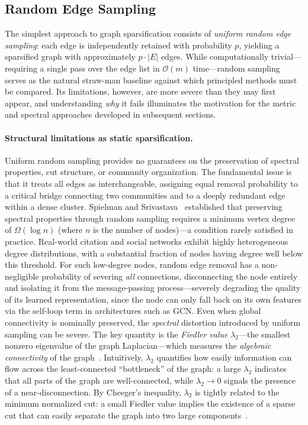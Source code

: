 \documentclass[conference]{IEEEtran}
\begin{document}
\subsection{Random Edge Sampling}

The simplest approach to graph sparsification consists of \emph{uniform random edge sampling}: each edge is independently retained with probability $p$, yielding a sparsified graph with approximately $p \cdot |E|$ edges. While computationally trivial---requiring a single pass over the edge list in $\mathcal{O}(m)$ time---random sampling serves as the natural straw-man baseline against which principled methods must be compared. Its limitations, however, are more severe than they may first appear, and understanding \emph{why} it fails illuminates the motivation for the metric and spectral approaches developed in subsequent sections.

\paragraph{Structural limitations as static sparsification.} Uniform random sampling provides no guarantees on the preservation of spectral properties, cut structure, or community organization. The fundamental issue is that it treats all edges as interchangeable, assigning equal removal probability to a critical bridge connecting two communities and to a deeply redundant edge within a dense cluster. Spielman and Srivastava~\cite{spielman2008} established that preserving spectral properties through random sampling requires a minimum vertex degree of $\Omega(\log n)$ (where $n$ is the number of nodes)---a condition rarely satisfied in practice. Real-world citation and social networks exhibit highly heterogeneous degree distributions, with a substantial fraction of nodes having degree well below this threshold. For such low-degree nodes, random edge removal has a non-negligible probability of severing \emph{all} connections, disconnecting the node entirely and isolating it from the message-passing process---severely degrading the quality of its learned representation, since the node can only fall back on its own features via the self-loop term in architectures such as GCN. Even when global connectivity is nominally preserved, the \emph{spectral} distortion introduced by uniform sampling can be severe. The key quantity is the \emph{Fiedler value} $\lambda_2$---the smallest nonzero eigenvalue of the graph Laplacian---which measures the \emph{algebraic connectivity} of the graph~\cite{chung1997}. Intuitively, $\lambda_2$ quantifies how easily information can flow across the least-connected ``bottleneck'' of the graph: a large $\lambda_2$ indicates that all parts of the graph are well-connected, while $\lambda_2 \to 0$ signals the presence of a near-disconnection. By Cheeger's inequality, $\lambda_2$ is tightly related to the minimum normalized cut: a small Fiedler value implies the existence of a sparse cut that can easily separate the graph into two large components~\cite{chung1997}.
\end{document}
